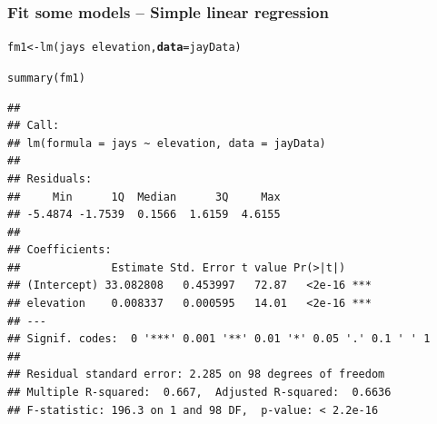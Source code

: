 \documentclass[color=usenames,dvipsnames]{beamer}\usepackage[]{graphicx}\usepackage[]{color}
\makeatletter
\newcommand{\hlopt}[1]{\textcolor[rgb]{0,0,0}{#1}}%
\newcommand{\hlstd}[1]{\textcolor[rgb]{0,0,0}{#1}}%
\newcommand{\hlkwb}[1]{\textcolor[rgb]{0,0.341,0.682}{#1}}%
\newcommand{\hlkwc}[1]{\textcolor[rgb]{0,0,0}{\textbf{#1}}}%
\newcommand{\hlkwd}[1]{\textcolor[rgb]{0.004,0.004,0.506}{#1}}%
\newenvironment{kframe}{%
 \def\at@end@of@kframe{}%
 \ifinner\ifhmode%
  \def\at@end@of@kframe{\end{minipage}}%
  \begin{minipage}{\columnwidth}%
 \fi\fi%
 \def\FrameCommand##1{\hskip\@totalleftmargin \hskip-\fboxsep
 \colorbox{shadecolor}{##1}\hskip-\fboxsep
     \hskip-\linewidth \hskip-\@totalleftmargin \hskip\columnwidth}%
 \MakeFramed {\advance\hsize-\width
   \@totalleftmargin\z@ \linewidth\hsize
   \@setminipage}}%
 {\par\unskip\endMakeFramed%
 \at@end@of@kframe}
\newenvironment{knitrout}{}{} %
\makeatother
\begin{document}
\begin{frame}[fragile]
  \frametitle{Fit some models -- Simple linear regression}
  \scriptsize
\begin{knitrout}
\color{fgcolor}\begin{kframe}
\begin{alltt}
\hlstd{fm1} \hlkwb{<-} \hlkwd{lm}\hlstd{(jays} \hlopt{~} \hlstd{elevation,} \hlkwc{data}\hlstd{=jayData)}
\end{alltt}
\end{kframe}
\end{knitrout}
\pause
\begin{knitrout}
\color{fgcolor}\begin{kframe}
\begin{alltt}
\hlkwd{summary}\hlstd{(fm1)}
\end{alltt}
\begin{verbatim}
## 
## Call:
## lm(formula = jays ~ elevation, data = jayData)
## 
## Residuals:
##     Min      1Q  Median      3Q     Max 
## -5.4874 -1.7539  0.1566  1.6159  4.6155 
## 
## Coefficients:
##              Estimate Std. Error t value Pr(>|t|)    
## (Intercept) 33.082808   0.453997   72.87   <2e-16 ***
## elevation    0.008337   0.000595   14.01   <2e-16 ***
## ---
## Signif. codes:  0 '***' 0.001 '**' 0.01 '*' 0.05 '.' 0.1 ' ' 1
## 
## Residual standard error: 2.285 on 98 degrees of freedom
## Multiple R-squared:  0.667,	Adjusted R-squared:  0.6636 
## F-statistic: 196.3 on 1 and 98 DF,  p-value: < 2.2e-16
\end{verbatim}
\end{kframe}
\end{knitrout}
\end{frame}
\end{document}
